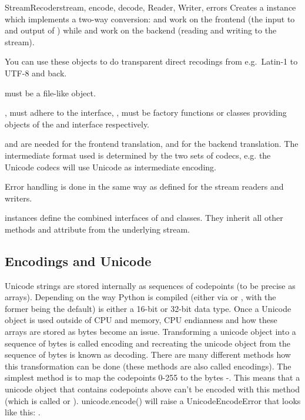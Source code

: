 \begin{classdesc}{StreamRecoder}{stream, encode, decode,
                                 Reader, Writer, errors}
  Creates a  instance which implements a two-way
  conversion:  and  work on the frontend (the
  input to  and output of ) while
   and  work on the backend (reading and
  writing to the stream).

  You can use these objects to do transparent direct recodings from
  e.g.\ Latin-1 to UTF-8 and back.

   must be a file-like object.

  ,  must adhere to the 
  interface, ,  must be factory functions or
  classes providing objects of the  and
   interface respectively.

   and  are needed for the frontend
  translation,  and  for the backend
  translation.  The intermediate format used is determined by the two
  sets of codecs, e.g. the Unicode codecs will use Unicode as
  intermediate encoding.

  Error handling is done in the same way as defined for the
  stream readers and writers.
\end{classdesc}

 instances define the combined interfaces of
 and  classes. They inherit
all other methods and attribute from the underlying stream.

\subsection{Encodings and Unicode\label{encodings-overview}}

Unicode strings are stored internally as sequences of codepoints (to
be precise as  arrays). Depending on the way Python is
compiled (either via  or 
, with the former being the default)
 is either a 16-bit or
32-bit data type. Once a Unicode object is used outside of CPU and
memory, CPU endianness and how these arrays are stored as bytes become
an issue. Transforming a unicode object into a sequence of bytes is
called encoding and recreating the unicode object from the sequence of
bytes is known as decoding. There are many different methods how this
transformation can be done (these methods are also called encodings).
The simplest method is to map the codepoints 0-255 to the bytes
-. This means that a unicode object that contains 
codepoints above  can't be encoded with this method (which 
is called  or ). unicode.encode() will 
raise a UnicodeEncodeError that looks like this: .

